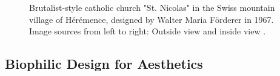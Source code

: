 \documentclass{article}
\begin{document}
\begin{figure}
    \centering
    \caption{Brutalist-style catholic church "St. Nicolas" in the Swiss mountain village of Hérémence, designed by Walter Maria Förderer in 1967. Image sources from left to right: Outside view \cite{bissegger_eglise_2018-1} and inside view \cite{bissegger_eglise_2018}.}
    \label{fig:kunstformen}
\end{figure}

\clearpage
\subsection{Biophilic Design for Aesthetics}
\end{document}
